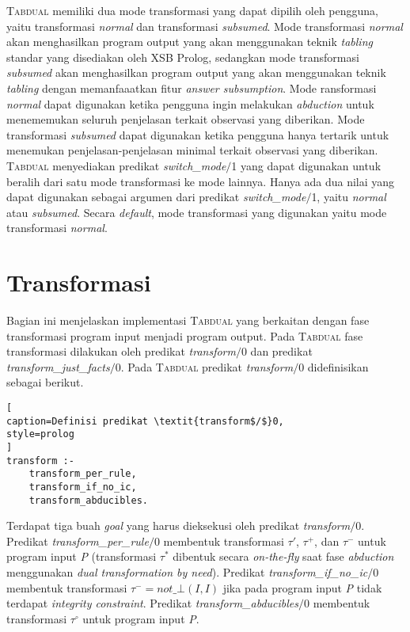 \textsc{Tabdual} memiliki dua mode transformasi yang dapat dipilih oleh pengguna, yaitu transformasi \textit{normal} dan transformasi \textit{subsumed}. Mode transformasi \textit{normal} akan menghasilkan program output yang akan menggunakan teknik \textit{tabling} standar yang disediakan oleh XSB Prolog, sedangkan mode transformasi \textit{subsumed} akan menghasilkan program output yang akan menggunakan teknik \textit{tabling} dengan memanfaaatkan fitur \textit{answer subsumption}. Mode ransformasi \textit{normal} dapat digunakan ketika pengguna ingin melakukan \textit{abduction} untuk menememukan seluruh penjelasan terkait observasi yang diberikan. Mode transformasi \textit{subsumed} dapat digunakan ketika pengguna hanya tertarik untuk menemukan penjelasan-penjelasan minimal terkait observasi yang diberikan. \textsc{Tabdual} menyediakan predikat \textit{switch\_mode$/$}1 yang dapat digunakan untuk beralih dari satu mode transformasi ke mode lainnya. Hanya ada dua nilai yang dapat digunakan sebagai argumen dari predikat \textit{switch\_mode$/$}1, yaitu \textit{normal} atau \textit{subsumed}. Secara \textit{default}, mode transformasi yang digunakan yaitu mode transformasi \textit{normal}.

\section{Transformasi}
\label{transform}

Bagian ini menjelaskan implementasi \textsc{Tabdual} yang berkaitan dengan fase transformasi program input menjadi program output. Pada \textsc{Tabdual} fase transformasi dilakukan oleh predikat \textit{transform$/$}0 dan predikat \textit{transform\_just\_facts$/$}0. Pada \textsc{Tabdual} predikat \textit{transform$/$}0 didefinisikan sebagai berikut.
\\

\begin{lstlisting}[
caption=Definisi predikat \textit{transform$/$}0,
style=prolog
]
transform :- 
	transform_per_rule,
	transform_if_no_ic,
	transform_abducibles.
\end{lstlisting}

Terdapat tiga buah \textit{goal} yang harus dieksekusi oleh predikat \textit{transform$/$}0. Predikat \textit{transform\_per\_rule$/$}0 membentuk transformasi $\tau'$, $\tau^+$, dan $\tau^-$ untuk program input \textit{P} (transformasi $\tau^*$  dibentuk secara \textit{on-the-fly} saat fase \textit{abduction} menggunakan \textit{dual transformation by need}). Predikat \textit{transform\_if\_no\_ic$/$}0 membentuk transformasi $\tau^- = \textit{not}\_\bot(\textit{I},\textit{I})$ jika pada program input \textit{P} tidak terdapat \textit{integrity constraint}. Predikat \textit{transform\_abducibles$/$}0 membentuk transformasi $\tau^\circ$ untuk program input \textit{P}. 

